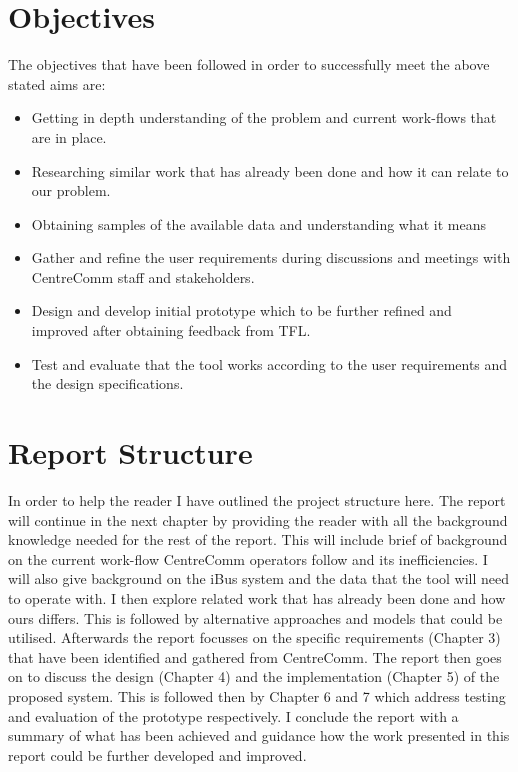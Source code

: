 \section{Objectives}
The objectives that have been followed in order to successfully meet the above stated aims are:
\begin{itemize}
	\item Getting in depth understanding of the problem and current work-flows that are in place.
	\item Researching similar work that has already been done and how it can relate to our problem.
	\item Obtaining samples of the available data and understanding what it means
	\item Gather and refine the user requirements during discussions and meetings with CentreComm staff and stakeholders.
	\item Design and develop initial prototype which to be further refined and improved after obtaining feedback from TFL.
	\item Test and evaluate that the tool works according to the user requirements and the design specifications.
\end{itemize}

\section{Report Structure}
In order to help the reader I have outlined the project structure here. The report will continue in the next chapter by providing the reader with all the background knowledge needed for the rest of the report. This will include brief of background on the current work-flow CentreComm operators follow and its inefficiencies. I will also give background on the iBus system and the data that the tool will need to operate with. I then explore related work that has already been done and how ours differs. This is followed by alternative approaches and models that could be utilised. Afterwards the report focusses on the specific requirements (Chapter 3) that have been identified and gathered from CentreComm. The report then goes on to discuss the design (Chapter 4) and the implementation (Chapter 5) of the proposed system. This is followed then by Chapter 6 and 7 which address testing and evaluation of the prototype respectively. I conclude the report with a summary of what has been achieved and guidance how the work presented in this report could be further developed and improved.